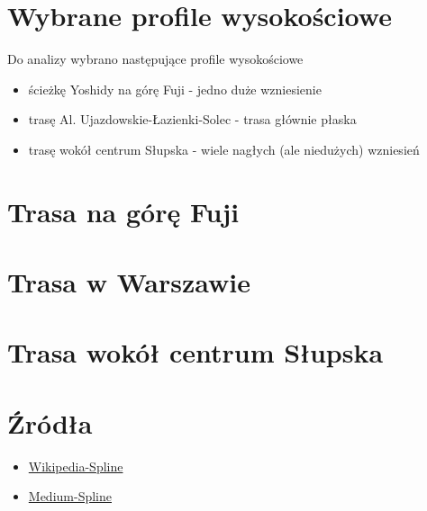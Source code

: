 \documentclass{article}
\begin{document}
\section{Wybrane profile wysokościowe}
Do analizy wybrano następujące profile wysokościowe
\begin{itemize}
	\item ścieżkę Yoshidy na górę Fuji - jedno duże wzniesienie
	\item trasę Al.  Ujazdowskie-Łazienki-Solec - trasa głównie płaska
	\item trasę wokół centrum Słupska - wiele nagłych (ale niedużych) wzniesień
\end{itemize}
\section{Trasa na górę Fuji}
\section{Trasa w Warszawie}
\section{Trasa wokół centrum Słupska}
\section{Źródła}
\begin{itemize}
	\item \href{https://en.wikipedia.org/w/index.php?title=Spline_%28mathematics%29&oldid=288288033#Algorithm_for_computing_natural_cubic_splines}{Wikipedia-Spline}
	\item \href{https://medium.com/eatpredlove/natural-cubic-splines-implementation-with-python-edf68feb57aa}{Medium-Spline}
\end{itemize}
\end{document}
